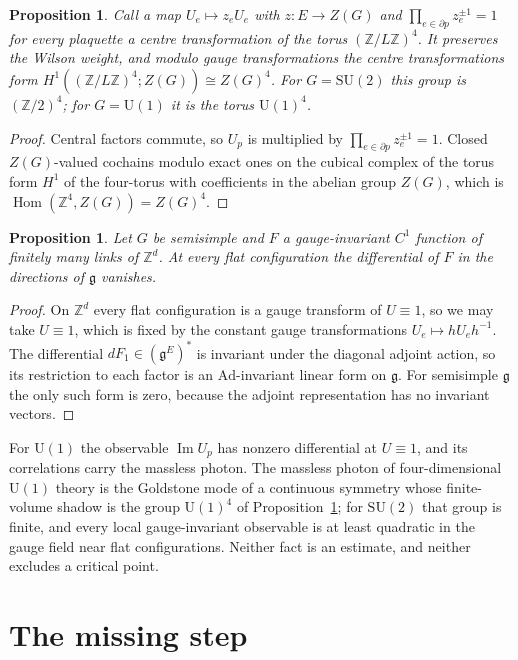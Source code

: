 \documentclass[11pt]{amsart}
\newtheorem{proposition}[theorem]{Proposition}
\theoremstyle{definition}
\theoremstyle{remark}
\newcommand{\Z}{\mathbb{Z}}
\newcommand{\SU}{\mathrm{SU}}
\newcommand{\U}{\mathrm{U}}
\newcommand{\g}{\mathfrak{g}}
\begin{document}
\begin{proposition}\label{prop:centre}
Call a map $U_e\mapsto z_eU_e$ with $z\colon E\to Z(G)$ and $\prod_{e\in\partial
p}z_e^{\pm1}=1$ for every plaquette a centre transformation of the torus
$(\Z/L\Z)^4$. It preserves the Wilson weight, and modulo gauge transformations
the centre transformations form $H^1((\Z/L\Z)^4;Z(G))\cong Z(G)^4$. For
$G=\SU(2)$ this group is $(\Z/2)^4$; for $G=\U(1)$ it is the torus $\U(1)^4$.
\end{proposition}

\begin{proof}
Central factors commute, so $U_p$ is multiplied by $\prod_{e\in\partial
p}z_e^{\pm1}=1$. Closed $Z(G)$-valued cochains modulo exact ones on the cubical
complex of the torus form $H^1$ of the four-torus with coefficients in the
abelian group $Z(G)$, which is $\operatorname{Hom}(\Z^4,Z(G))=Z(G)^4$.
\end{proof}

\begin{proposition}\label{prop:nolinear}
Let $G$ be semisimple and $F$ a gauge-invariant $C^1$ function of finitely many
links of $\Z^d$. At every flat configuration the differential of $F$ in the
directions of $\g$ vanishes.
\end{proposition}

\begin{proof}
On $\Z^d$ every flat configuration is a gauge transform of $U\equiv1$, so we may
take $U\equiv1$, which is fixed by the constant gauge transformations
$U_e\mapsto hU_eh^{-1}$. The differential $dF_1\in(\g^E)^*$ is invariant under
the diagonal adjoint action, so its restriction to each factor is an
$\mathrm{Ad}$-invariant linear form on $\g$. For semisimple $\g$ the only such
form is zero, because the adjoint representation has no invariant vectors.
\end{proof}

For $\U(1)$ the observable $\operatorname{Im}U_p$ has nonzero differential at
$U\equiv1$, and its correlations carry the massless photon. The massless photon
of four-dimensional $\U(1)$ theory is the Goldstone mode of a continuous
symmetry whose finite-volume shadow is the group $\U(1)^4$ of
Proposition~\ref{prop:centre}; for $\SU(2)$ that group is finite, and every
local gauge-invariant observable is at least quadratic in the gauge field near
flat configurations. Neither fact is an estimate, and neither excludes a
critical point.

\section{The missing step}\label{sec:open}
\end{document}
